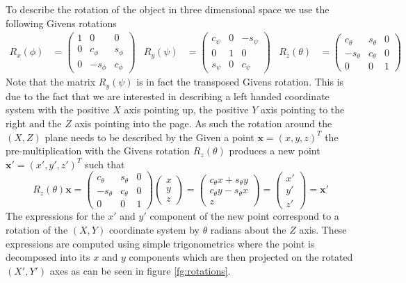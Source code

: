 \documentclass[11pt,a4paper]{report}
\begin{document}
To describe the rotation of the object in three dimensional space we
use the following Givens rotations
\begin{align}\label{eq:rotations}
R_x(\phi) &= \begin{pmatrix}1&0&0\\0&c_\phi&s_\phi\\0&-s_\phi&c_\phi\end{pmatrix} &  R_y(\psi)
  &= \begin{pmatrix}c_\psi&0&-s_\psi\\0&1&0\\s_\psi&0&c_\psi\end{pmatrix}
 & R_z(\theta) &= \begin{pmatrix}c_\theta&s_\theta&0\\-s_\theta&c_\theta&0\\0&0&1\end{pmatrix}
\end{align}
Note that the matrix $R_y(\psi)$ is in fact the transposed Givens rotation. This
is due to the fact that we are interested in describing a left handed coordinate\footnotemark {} system with the positive $X$ axis pointing up, the positive $Y$
axis pointing to the right and the $Z$ axis pointing into the page. As such the
rotation around the $(X,Z)$ plane needs to be described by the 
Given a point $\mathbf{x} = (x,y,z)^T$ the pre-multiplication with the
Givens rotation $R_z(\theta)$ produces a new point $\mathbf{x'} = (x',y',z')^T$ such that 
\begin{equation}\label{eq:rotated}
R_z(\theta) \mathbf{x} = \begin{pmatrix}c_\theta&s_\theta&0\\-s_\theta&c_\theta&0\\0&0&1\end{pmatrix}\begin{pmatrix}x\\y\\z\end{pmatrix}
    = \begin{pmatrix}c_\theta x + s_\theta y\\c_\theta y - s_\theta
      x\\z\end{pmatrix} = \begin{pmatrix}x'\\y'\\z'\end{pmatrix} = \mathbf{x'}
\end{equation}
The expressions for the $x'$ and $y'$ component of the new point correspond to a
rotation of the $(X,Y)$ coordinate system by $\theta$ radians about the $Z$
axis. These expressions are computed using simple trigonometrics where the point
is decomposed into its $x$ and $y$ components which are then projected on the rotated
$(X',Y')$ axes as can be seen in figure \ref{fg:rotations}. 
\end{document}
